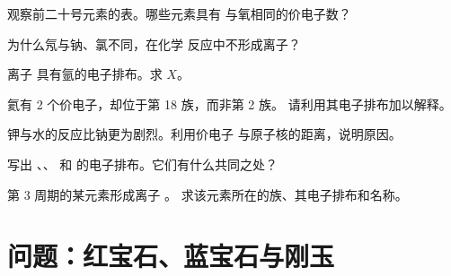 \begin{exercise}[$\star\star$]\label{exo:g10:electron-shells:9}
观察前二十号元素的表。哪些元素具有
与氧相同的价电子数？
\end{exercise}

\begin{exercise}[$\star\star$]\label{exo:g10:electron-shells:10}
为什么氖与钠、氯不同，在化学
反应中不形成离子？
\end{exercise}

\begin{exercise}[$\star\star$]\label{exo:g10:electron-shells:11}
离子  具有氩的电子排布。求 $X$。
\end{exercise}

\begin{exercise}[$\star\star\star$]\label{exo:g10:electron-shells:12}
氦有 2 个价电子，却位于第 18 族，而非第 2 族。
请利用其电子排布加以解释。
\end{exercise}

\begin{exercise}[$\star\star\star$]\label{exo:g10:electron-shells:13}
钾与水的反应比钠更为剧烈。利用价电子
与原子核的距离，说明原因。
\end{exercise}

\begin{exercise}[$\star\star\star$]\label{exo:g10:electron-shells:14}
写出 、、 和
 的电子排布。它们有什么共同之处？
\end{exercise}

\begin{exercise}[$\star\star\star$]\label{exo:g10:electron-shells:15}
第 3 周期的某元素形成离子 。
求该元素所在的族、其电子排布和名称。
\end{exercise}

\section{问题：红宝石、蓝宝石与刚玉}

